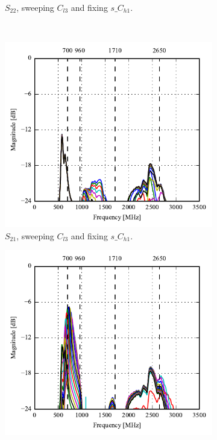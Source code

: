 \begin{figure}[htbp]
\begin{subfigure}[b]{0.49\linewidth}
        \caption{$S_{22}$, sweeping $C_{l3}$ and fixing $s\_C_{h1}$.}
    \end{subfigure}
    \\
    \begin{subfigure}[b]{0.49\linewidth}
        \centering
        \includegraphics{img/tech_sol/nonresonant/simulation/talk_mode/s12_top_sweep.pdf}
        \caption{$S_{21}$, sweeping $C_{l3}$ and fixing $s\_C_{h1}$.}
    \end{subfigure}
    \hfill
    \begin{subfigure}[b]{0.49\linewidth}
        \centering
        \includegraphics{img/tech_sol/nonresonant/simulation/talk_mode/s21_side_sweep.pdf}

\end{subfigure}
\end{figure}
